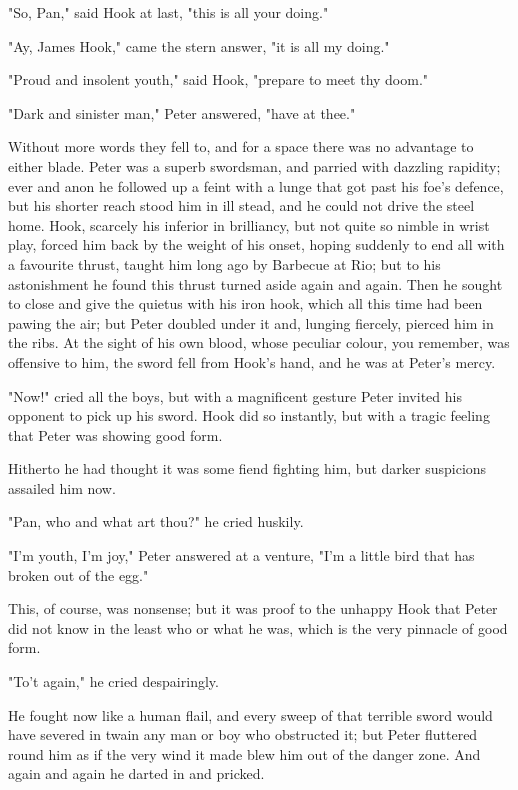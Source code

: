 "So, Pan," said Hook at last, "this is all your doing."


"Ay, James Hook," came the stern answer, "it is all my doing."


"Proud and insolent youth," said Hook, "prepare to meet thy doom."


"Dark and sinister man," Peter answered, "have at thee."


Without more words they fell to, and for a space there was no advantage to
either blade. Peter was a superb swordsman, and parried with dazzling
rapidity; ever and anon he followed up a feint with a lunge that got past
his foe's defence, but his shorter reach stood him in ill stead, and he
could not drive the steel home. Hook, scarcely his inferior in brilliancy,
but not quite so nimble in wrist play, forced him back by the weight of
his onset, hoping suddenly to end all with a favourite thrust, taught him
long ago by Barbecue at Rio; but to his astonishment he found this thrust
turned aside again and again. Then he sought to close and give the quietus
with his iron hook, which all this time had been pawing the air; but Peter
doubled under it and, lunging fiercely, pierced him in the ribs. At the
sight of his own blood, whose peculiar colour, you remember, was offensive
to him, the sword fell from Hook's hand, and he was at Peter's mercy.


"Now!" cried all the boys, but with a magnificent gesture Peter invited
his opponent to pick up his sword. Hook did so instantly, but with a
tragic feeling that Peter was showing good form.


Hitherto he had thought it was some fiend fighting him, but darker
suspicions assailed him now.


"Pan, who and what art thou?" he cried huskily.


"I'm youth, I'm joy," Peter answered at a venture, "I'm a little bird that
has broken out of the egg."


This, of course, was nonsense; but it was proof to the unhappy Hook that
Peter did not know in the least who or what he was, which is the very
pinnacle of good form.


"To't again," he cried despairingly.


He fought now like a human flail, and every sweep of that terrible sword
would have severed in twain any man or boy who obstructed it; but Peter
fluttered round him as if the very wind it made blew him out of the danger
zone. And again and again he darted in and pricked.


